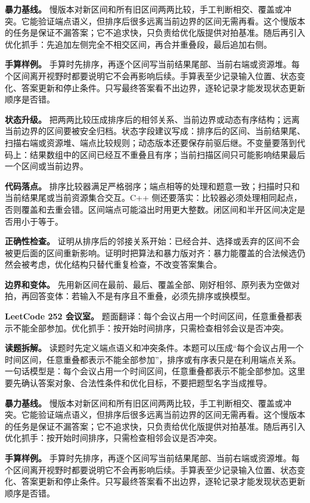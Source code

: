 \textbf{暴力基线。} 慢版本对新区间和所有旧区间两两比较，手工判断相交、覆盖或冲突。它能验证端点语义，但排序后很多远离当前边界的区间无需再看。这个慢版本的任务是保证不漏答案；它不追求快，只负责给优化版提供对拍基准。随后再引入优化抓手：先追加左侧完全不相交区间，再合并重叠段，最后追加右侧。

\textbf{手算样例。} 手算时先排序，再逐个区间写当前结果尾部、当前右端或资源堆。每个区间离开视野时都要说明它不会再影响后续。手算表至少记录输入位置、状态变化、答案更新和停止条件。只写最终答案看不出边界，逐轮记录才能发现状态更新顺序是否错。

\textbf{状态升级。} 把两两比较压成排序后的相邻关系、当前边界或动态有序结构；远离当前边界的区间要被安全归档。状态字段建议写成：排序后的区间、当前结果尾、扫描右端或资源堆、端点比较规则；动态版本还要保存前驱后继。不变量要落到代码上：结果数组中的区间已经互不重叠且有序；当前扫描区间只可能影响结果最后一个区间或当前边界。

\textbf{代码落点。} 排序比较器满足严格弱序；端点相等的处理和题意一致；扫描时只和当前结果尾或当前资源集合交互。C++ 侧还要落实：比较器必须处理相同起点，否则覆盖和去重会错。区间端点可能溢出时用更大整数。闭区间和半开区间决定是否用小于等于。

\textbf{正确性检查。} 证明从排序后的邻接关系开始：已经合并、选择或丢弃的区间不会被更后面的区间重新影响。证明时把算法和暴力版对齐：暴力能覆盖的合法候选仍然会被考虑，优化结构只替代重复检查，不改变答案集合。

\textbf{边界和变体。} 先用新区间在最前、最后、覆盖全部、刚好相邻、原列表为空做对拍，再回答变体：若输入不是有序且不重叠，必须先排序或换模型。

\noindent\textbf{LeetCode 252 会议室。} 题面翻译：每个会议占用一个时间区间，任意重叠都表示不能全部参加。优化抓手：按开始时间排序，只需检查相邻会议是否冲突。

\textbf{读题拆解。} 读题时先定义端点语义和冲突条件。本题可以压成“每个会议占用一个时间区间，任意重叠都表示不能全部参加”，排序或有序表只是在利用端点关系。一句话模型是：每个会议占用一个时间区间，任意重叠都表示不能全部参加。这里要先确认答案对象、合法性条件和优化目标，不要把题型名字当成推导。

\textbf{暴力基线。} 慢版本对新区间和所有旧区间两两比较，手工判断相交、覆盖或冲突。它能验证端点语义，但排序后很多远离当前边界的区间无需再看。这个慢版本的任务是保证不漏答案；它不追求快，只负责给优化版提供对拍基准。随后再引入优化抓手：按开始时间排序，只需检查相邻会议是否冲突。

\textbf{手算样例。} 手算时先排序，再逐个区间写当前结果尾部、当前右端或资源堆。每个区间离开视野时都要说明它不会再影响后续。手算表至少记录输入位置、状态变化、答案更新和停止条件。只写最终答案看不出边界，逐轮记录才能发现状态更新顺序是否错。


